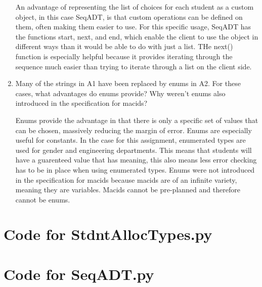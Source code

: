 \documentclass[12pt]{article}
\begin{document}
\begin{enumerate}
An advantage of representing the list of choices for each student as a custom object, in this case SeqADT,
is that custom operations can be defined on them, often making them easier to use. For this specific usage,
SeqADT has the functions start, next, and end, which enable the client to use the object in different ways
than it would be able to do with just a list. THe next() function is especially helpful because it provides
iterating through the sequence much easier than trying to iterate through a list on the client side.

\item Many of the strings in A1 have been replaced by enums in A2. For these cases, what advantages do enums provide?
Why weren't enums also introduced in the specification for macids?

Enums provide the advantage in that there is only a specific set of values that can be chosen, massively reducing 
the margin of error. Enums are especially useful for constants. In the case for this assignment, enumerated types are used for gender and engineering departments.
This means that students will have a guarenteed value that has meaning, this also means less error checking has to be in place
when using enumerated types. Enums were not introduced in the specification for macids because macids are of an infinite
variety, meaning they are variables. Macids cannot be pre-planned and therefore cannot be enums.

\end{enumerate}

\newpage

\lstset{language=Python, basicstyle=\tiny, breaklines=true, showspaces=false,
  showstringspaces=false, breakatwhitespace=true}

\def\thesection{\Alph{section}}

\section{Code for StdntAllocTypes.py}

\noindent 

\newpage

\section{Code for SeqADT.py}

\noindent 
\end{document}
